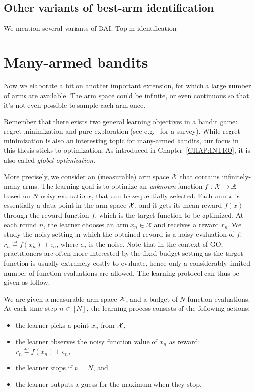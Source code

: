 \subsection{Other variants of best-arm identification}\label{sec:mab.extensions.other}

We mention several variants of BAI. Top-m identification~\citep{kalyanakrishnan2010}

\section{Many-armed bandits}\label{sec:mab.continuum}

Now we elaborate a bit on another important extension, for which a large number of arms are available. The arm space could be infinite, or even continuous so that it's not even possible to sample each arm once.

Remember that there exists two general learning objectives in a bandit game: regret minimization and pure exploration (see e.g.~\citealt{kaufmann2017survey} for a survey). While regret minimization is also an interesting topic for many-armed bandits, our focus in this thesis sticks to optimization. As introduced in Chapter~\ref{CHAP:INTRO}, it is also called \emph{global optimization}.

More precisely, we consider an (measurable) arm space $\mathcal{X}$ that contains infinitely-many arms. The learning goal is to optimize an \emph{unknown} function $f: \mathcal{X} \rightarrow \mathbb{R}$ based on $N$ noisy evaluations, that can be sequentially selected. Each arm $x$ is essentially a data point in the arm space $\mathcal{X}$, and it gets its mean reward $f(x)$ through the reward function $f$, which is the target function to be optimized. At each round $n$, the learner chooses an arm $x_n \in \mathcal{X}$ and receives a reward $r_n$. We study the noisy setting in which the obtained reward is a noisy evaluation of $f$: $r_n \eqdef f(x_n) + \epsilon_n$, where $\epsilon_n$ is the noise. Note that in the context of GO, practitioners are often more interested by the fixed-budget setting as the target function is usually extremely costly to evaluate, hence only a considerably limited number of function evaluations are allowed. The learning protocol can thus be given as follow.

\begin{definition}\label{def:mab.go}
\begin{leftbar}[defnbar]
	We are given a measurable arm space $\mathcal{X}$, and a budget of $N$ function evaluations. At each time step $n\in[N]$, the learning process consists of the following actions:
\begin{itemize}
	\item the learner picks a point $x_n$ from $\mathcal{X}$,
	\item the learner observes the noisy function value of $x_n$ as reward: $r_n \eqdef f(x_n) + \epsilon_n$,
	\item the learner stops if $n=N$, and
	\item the learner outputs a guess for the maximum when they stop.
\end{itemize}
\end{leftbar}
\end{definition}

